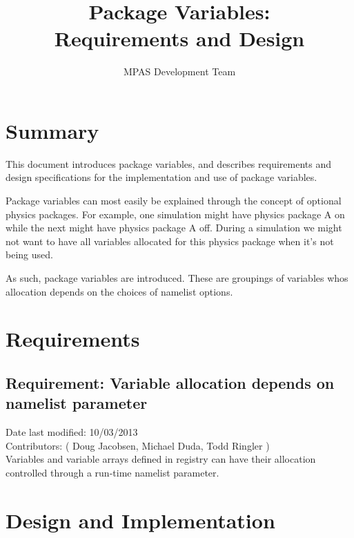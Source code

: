 \documentclass[11pt]{report}
\begin{document}
\title{Package Variables: \\
Requirements and Design}
\author{MPAS Development Team}

\maketitle
\tableofcontents


\chapter{Summary}

This document introduces package variables, and describes requirements and
design specifications for the implementation and use of package variables.

Package variables can most easily be explained through the concept of optional
physics packages. For example, one simulation might have physics package A on
while the next might have physics package A off. During a simulation we might
not want to have all variables allocated for this physics package when it's not
being used.

As such, package variables are introduced. These are groupings of variables
whos allocation depends on the choices of namelist options. 


\chapter{Requirements}

\section{Requirement: Variable allocation depends on namelist parameter}
Date last modified: 10/03/2013 \\
Contributors: ( Doug Jacobsen, Michael Duda, Todd Ringler )\\

Variables and variable arrays defined in registry can have their allocation
controlled through a run-time namelist parameter.


\chapter{Design and Implementation}
\end{document}
